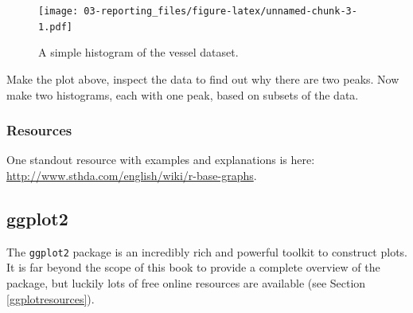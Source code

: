 \documentclass[]{book}
\newenvironment{Shaded}{\begin{snugshade}}{\end{snugshade}}
\newcommand{\CommentTok}[1]{\textcolor[rgb]{0.56,0.35,0.01}{\textit{#1}}}
\newcommand{\DataTypeTok}[1]{\textcolor[rgb]{0.13,0.29,0.53}{#1}}
\newcommand{\DecValTok}[1]{\textcolor[rgb]{0.00,0.00,0.81}{#1}}
\newcommand{\FloatTok}[1]{\textcolor[rgb]{0.00,0.00,0.81}{#1}}
\newcommand{\KeywordTok}[1]{\textcolor[rgb]{0.13,0.29,0.53}{\textbf{#1}}}
\newcommand{\NormalTok}[1]{#1}
\newcommand{\OperatorTok}[1]{\textcolor[rgb]{0.81,0.36,0.00}{\textbf{#1}}}
\newcommand{\StringTok}[1]{\textcolor[rgb]{0.31,0.60,0.02}{#1}}
\let\BeginKnitrBlock\begin \let\EndKnitrBlock\end
\begin{document}
\begin{Shaded}
\end{Shaded}

\begin{figure}
\centering
\texttt{[image: 03-reporting\_files/figure-latex/unnamed-chunk-3-1.pdf]}
\caption{\label{fig:unnamed-chunk-3}A simple histogram of the vessel dataset.}
\end{figure}

\BeginKnitrBlock{rmdtry}
Make the plot above, inspect the data to find out why there are two peaks. Now make two histograms, each with one peak, based on subsets of the data.
\EndKnitrBlock{rmdtry}

\hypertarget{resources}{%
\subsubsection{Resources}\label{resources}}

One standout resource with examples and explanations is here: \url{http://www.sthda.com/english/wiki/r-base-graphs}.

\hypertarget{ggplot2}{%
\subsection{ggplot2}\label{ggplot2}}

The \texttt{ggplot2} package is an incredibly rich and powerful toolkit to construct plots. It is far beyond the scope of this book to provide a complete overview of the package, but luckily lots of free online resources are available (see Section \ref{ggplotresources}).
\end{document}

